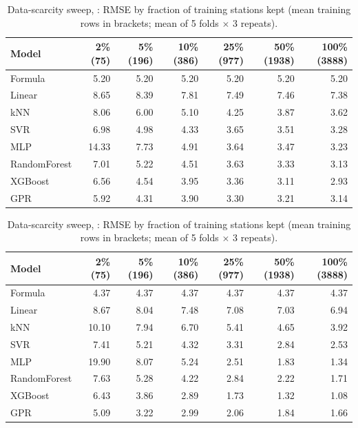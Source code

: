 \begin{table}[h]
\centering\small
\caption{Data-scarcity sweep, : RMSE by fraction of training stations kept (mean training rows in brackets; mean of 5 folds $\times$ 3 repeats).}
\label{tab:app-scar-s3}
\begin{tabular}{lrrrrrr}
\toprule
Model & 2\% (75) & 5\% (196) & 10\% (386) & 25\% (977) & 50\% (1938) & 100\% (3888) \\
\midrule
Formula & 5.20 & 5.20 & 5.20 & 5.20 & 5.20 & 5.20 \\
Linear & 8.65 & 8.39 & 7.81 & 7.49 & 7.46 & 7.38 \\
kNN & 8.06 & 6.00 & 5.10 & 4.25 & 3.87 & 3.62 \\
SVR & 6.98 & 4.98 & 4.33 & 3.65 & 3.51 & 3.28 \\
MLP & 14.33 & 7.73 & 4.91 & 3.64 & 3.47 & 3.23 \\
RandomForest & 7.01 & 5.22 & 4.51 & 3.63 & 3.33 & 3.13 \\
XGBoost & 6.56 & 4.54 & 3.95 & 3.36 & 3.11 & 2.93 \\
GPR & 5.92 & 4.31 & 3.90 & 3.30 & 3.21 & 3.14 \\
\bottomrule
\end{tabular}
\end{table}

\begin{table}[h]
\centering\small
\caption{Data-scarcity sweep, : RMSE by fraction of training stations kept (mean training rows in brackets; mean of 5 folds $\times$ 3 repeats).}
\label{tab:app-scar-s7}
\begin{tabular}{lrrrrrr}
\toprule
Model & 2\% (75) & 5\% (196) & 10\% (386) & 25\% (977) & 50\% (1938) & 100\% (3888) \\
\midrule
Formula & 4.37 & 4.37 & 4.37 & 4.37 & 4.37 & 4.37 \\
Linear & 8.67 & 8.04 & 7.48 & 7.08 & 7.03 & 6.94 \\
kNN & 10.10 & 7.94 & 6.70 & 5.41 & 4.65 & 3.92 \\
SVR & 7.41 & 5.21 & 4.32 & 3.31 & 2.84 & 2.53 \\
MLP & 19.90 & 8.07 & 5.24 & 2.51 & 1.83 & 1.34 \\
RandomForest & 7.63 & 5.28 & 4.22 & 2.84 & 2.22 & 1.71 \\
XGBoost & 6.43 & 3.86 & 2.89 & 1.73 & 1.32 & 1.08 \\
GPR & 5.09 & 3.22 & 2.99 & 2.06 & 1.84 & 1.66 \\
\bottomrule
\end{tabular}
\end{table}

